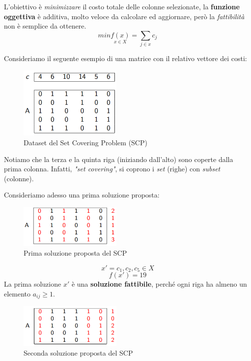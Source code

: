\documentclass{article}
\begin{document}
L'obiettivo è \textit{minimizzare} il costo totale delle colonne selezionate, la \textbf{funzione oggettiva}
è additiva, molto veloce da calcolare ed aggiornare, però la \textit{fattibilità} non è
semplice da ottenere.
$$min\underset{x\in X}{f(x)}=\sum_{j\in x}c_j$$

Consideriamo il seguente esempio di una matrice con il relativo vettore dei costi:

\begin{figure}[H]
    \centering
    \includegraphics[width=5cm]{images/SCP_datasets.png}
    \caption{Dataset del Set Covering Problem (SCP)}
    \label{fig:dataset_SCP}
\end{figure}
Notiamo che la terza e la quinta riga (iniziando dall'alto) sono coperte dalla prima
colonna. Infatti, \textit{"set covering"}, si coprono i \textit{set} (righe) con
\textit{subset} (colonne).

Consideriamo adesso una prima soluzione proposta:
\begin{figure}[H]
    \centering
    \includegraphics[width=5cm]{images/SCP_first_sol.png}
    \caption{Prima soluzione proposta del SCP}
    \label{fig:sol1_SCP}
\end{figure}

$$x'={c_1,c_2,c_5 }\in X$$
$$f(x')=19$$
La prima soluzione $x'$ è una \textbf{soluzione fattibile}, perché ogni riga ha almeno un elemento
$a_{ij}\geq 1$.

\begin{figure}[H]
    \centering
    \includegraphics[width=5cm]{images/SCP_snd_sol.png}
    \caption{Seconda soluzione proposta del SCP}
    \label{fig:sol2_SCP}
\end{figure}
\end{document}
